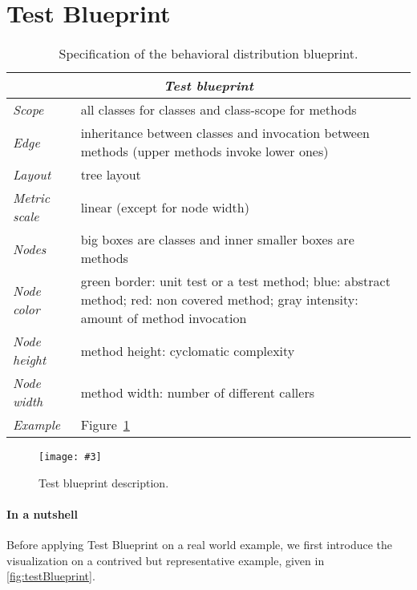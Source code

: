 \documentclass[runningheads]{llncs}
\newcommand{\fig}[4]{
	\begin{figure}[#1]
		\centering
		\texttt{[image: \#3]}
		\caption{\label{fig:#3}#4}
	\end{figure}}
\newcommand{\figref}[1]{Figure~\ref{fig:#1}}
\newcommand{\tablabel}[1]{\label{tab:#1}}
\begin{document}
\section{Test Blueprint}


\begin{table}
\begin{center}
\begin{tabular}{|l|p{6cm}|}\hline
\multicolumn{2}{|c|}{\emph{\textbf{Test blueprint}}}\\\hline\hline

\emph{Scope}		& all classes for classes and class-scope for methods \\\hline 
\hline
\emph{Edge}		& inheritance between classes and invocation between methods (upper methods invoke lower ones)\\ 
\emph{Layout}		& tree layout\\ 
\emph{Metric scale}	& linear (except for node width)\\
\emph{Nodes}		& big boxes are classes and inner smaller boxes are methods\\ \hline
\hline
\emph{Node color}	& green border: unit test or a test method; blue: abstract method; red: non covered method; gray intensity: amount of method invocation\\
\emph{Node height}	& method height: cyclomatic complexity \\
\emph{Node width}	& method width: number of different callers\\\hline 
\hline
\emph{Example} 	   & \figref{testBlueprint}\\\hline

\end{tabular}
\end{center}
\caption{Specification of the behavioral distribution blueprint.} \tablabel{behavioralBlueprint}
\end{table}



\fig{}{0.4}{testBlueprint}{Test blueprint description.}

\paragraph{In a nutshell} Before applying Test Blueprint on a real world example, we first introduce the visualization on a contrived but representative example, given in \autoref{fig:testBlueprint}.
\end{document}
